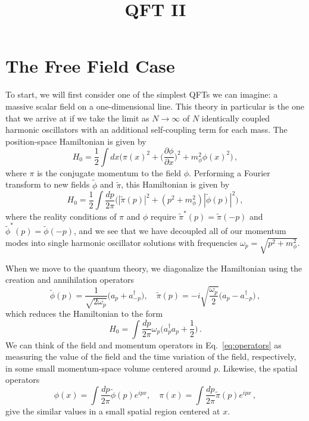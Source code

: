 \documentclass{article}
\title{QFT II}
\author{}
\date{}
\newcommand{\td}[1]{\tilde{#1}}
\numberwithin{equation}{subsection}
\begin{document}
\maketitle

\section{The Free Field Case}

To start, we will first consider one of the simplest QFTs we can imagine: a massive scalar field on a one-dimensional line. 
This theory in particular is the one that we arrive at if we take the limit as $N\to \infty$ of $N$ identically coupled harmonic oscillators 
with an additional self-coupling term for each mass. The position-space Hamiltonian is given by
\begin{equation}\label{eq:freeH0}
    H_0 = \frac{1}{2}\int dx\Bigg(\pi(x)^2 + \Big(\frac{\partial\phi}{\partial x}\Big)^2 + m_\phi^2\phi(x)^2\Bigg)\,,
\end{equation}
where $\pi$ is the conjugate momentum to the field $\phi$. Performing a Fourier transform to new fields $\td{\phi}$ and $\td{\pi}$, this Hamiltonian is given by
\begin{equation}\label{eq:freeH0Mom}
    H_0 = \frac{1}{2}\int \frac{dp}{2\pi}\Big(|\td{\pi}(p)|^2 + (p^2 + m_\phi^2)|\td{\phi}(p)|^2\Big)\,,
\end{equation}
where the reality conditions of $\pi$ and $\phi$ require $\td{\pi}^*(p) = \td{\pi}(-p)$ and $\td{\phi}^*(p) = \td{\phi}(-p)$, and we see that we have 
decoupled all of our momentum modes into single harmonic oscillator solutions with frequencies $\omega_p = \sqrt{p^2 + m_\phi^2}$.

When we move to the quantum theory, we diagonalize the Hamiltonian using the creation and annihilation operators
\begin{equation}\label{eq:operators}
    \td{\phi}(p) = \frac{1}{\sqrt{2\omega_p}}\Big(a_p + a^\dag_{-p}\Big), \quad \td{\pi}(p) = -i\sqrt{\frac{\omega_p}{2}}\Big(a_p - a^\dag_{-p}\Big)\,,
\end{equation}
which reduces the Hamiltonian to the form
\begin{equation}
    H_0 = \int\frac{dp}{2\pi}\omega_p\Big(a_p^\dag a_p + \frac{1}{2}\Big)\,.
\end{equation}
We can think of the field and momentum operators in Eq.~\eqref{eq:operators} as measuring the value of the field and the time variation of the field, 
respectively, in some small momentum-space volume centered around $p$. Likewise, the spatial operators
\begin{equation}
    \phi(x) = \int\frac{dp}{2\pi}\tilde{\phi}(p)e^{ipx}, \quad \pi(x) = \int \frac{dp}{2\pi}\tilde{\pi}(p)e^{ipx}\,,
\end{equation}
give the similar values in a small spatial region centered at $x$.
\end{document}
